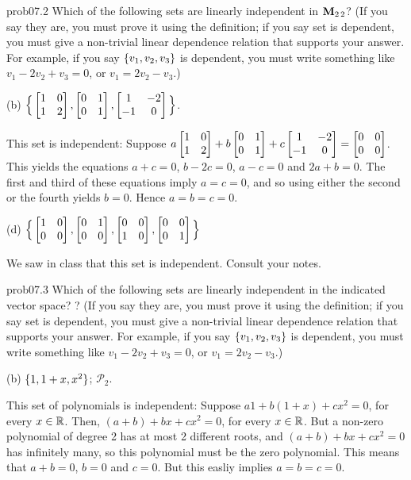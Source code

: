 \begin{sol}{prob07.2} Which of the following sets are linearly independent in $\mathbf{M}_{2 \,2}$? (If you say they are, you must prove it using the definition; if you say   set is dependent, you must give a non-trivial linear dependence relation that supports your answer. For example, if you say $\{v_1, v_2, v_3 \}$ is dependent, you must write something like  $v_1-2 v_2 +v_3=0$, or $v_1=2 v_2 -v_3$.)
\medskip

(b)  $\Big\{\bmatrix 1&0\\1&2\endbmatrix, \bmatrix 0&1\\0&1\endbmatrix , \bmatrix 1&-2\\-1&0\endbmatrix \Big\}$.

\soln This set is independent: Suppose $ a\bmatrix 1&0\\1&2\endbmatrix +b \bmatrix 0&1\\0&1\endbmatrix +c \bmatrix 1&-2\\-1&0\endbmatrix =\bmatrix 0&0\\0&0\endbmatrix $. This yields the equations $a+c=0$, $b-2c=0$, $a-c=0$ and $2a+b=0$. The first and third of these equations imply $a=c=0$, and so using either the second or the fourth yields $b=0$. Hence $a=b=c=0$.   \medskip
%

(d)  $\Big\{\bmatrix 1&0\\0&0\endbmatrix, \bmatrix 0&1\\0&0\endbmatrix,\bmatrix 0&0\\1&0\endbmatrix,\bmatrix 0&0\\0&1\endbmatrix \Big\}$ 

\soln We saw in class that this set is independent. Consult your notes. \medskip
%

 

\end{sol}\begin{sol}{prob07.3} Which of the following sets are linearly independent in the indicated vector space? ? (If you say they are, you must prove it using the definition; if you say   set is dependent, you must give a non-trivial linear dependence relation that supports your answer. For example, if you say $\{v_1, v_2, v_3 \}$ is dependent, you must write something like  $v_1-2 v_2 +v_3=0$, or $v_1=2 v_2 -v_3$.)

(b)  $\{1, 1+x, x^2 \}$;  $\mathcal P_2$. 

\soln This set of polynomials is independent: Suppose $a 1 + b(1+x)+ cx^2=0$, for every $x\in \mathbb{R}$. Then, $(a+b) +bx +cx^2=0$, for every $x\in \mathbb{R}$. But a non-zero polynomial of degree 2 has at most 2 different roots, and $(a+b) +bx +cx^2=0$ has infinitely many, so this polynomial must be the zero polynomial. This means that $a+b=0$, $b=0$ and $c=0$. But this easliy implies $a=b=c=0$. \medskip 
%


\end{sol}
